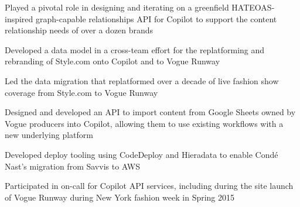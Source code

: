 \begin{job}

  \begin{accomplishments}
    \item Played a pivotal role in designing and iterating on a greenfield
    HATEOAS-inspired graph-capable relationships API for Copilot to support the
    content relationship needs of over a dozen brands
    \item Developed a data model in a cross-team effort for the replatforming
    and rebranding of Style.com onto Copilot and to Vogue Runway
    \item Led the data migration that replatformed over a decade of live fashion
    show coverage from Style.com to Vogue Runway
    \item Designed and developed an API to import content from Google Sheets
    owned by Vogue producers into Copilot, allowing them to use existing
    workflows with a new underlying platform
    \item Developed deploy tooling using CodeDeploy and Hieradata to enable
    Cond\'{e} Nast's migration from Savvis to AWS
    \item Participated in on-call for Copilot API services, including during the
    site launch of Vogue Runway during New York fashion week in Spring 2015
  \end{accomplishments}
\end{job}
